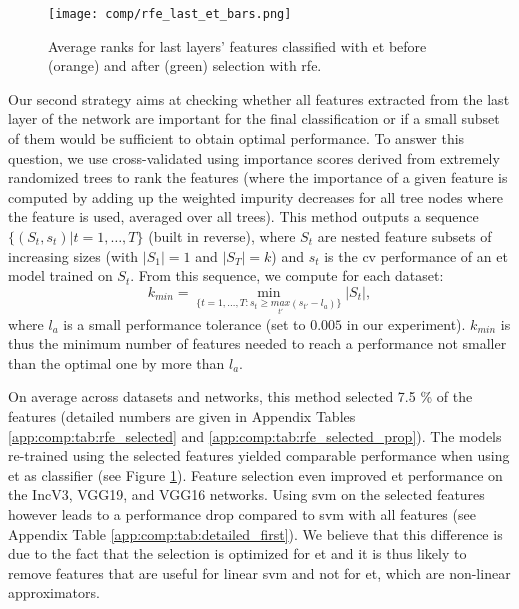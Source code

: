 \begin{figure}
    \centering
    \texttt{[image: comp/rfe\_last\_et\_bars.png]}
    \caption{Average ranks for last layers' features classified with \acrshort{et} before (orange) and after (green) selection with \acrlong{rfe}.}
    \label{fig:comp:exp_rfe_last_et_cmp}
\end{figure}

Our second strategy aims at checking whether all features extracted from the last layer of the network are important for the final classification or if a small subset of them would be sufficient to obtain optimal performance. To answer this question, we use cross-validated  \cite{guyon2002gene} using importance scores derived from extremely randomized trees to rank the features (where the importance of a given feature is computed by adding up the weighted impurity decreases for all tree nodes where the feature is used, averaged over all trees). This method outputs a sequence $\{(S_t,s_t)|t=1,\ldots,T\}$ (built in reverse), where $S_t$ are nested feature subsets of increasing sizes (with $|S_1|=1$ and $|S_T|=k$) and $s_t$ is the \acrlong{cv} performance of an \acrshort{et} model trained on $S_t$. From this sequence, we compute for each dataset:
$$k_{min} = \min_{\{t=1,\ldots,T: s_t\geq \underset{t'}{max} (s_{t'}-l_a)\}} |S_t|,$$
where $l_a$ is a small performance tolerance (set to $0.005$ in our experiment). $k_{min}$ is thus the minimum number of features needed to reach a performance not smaller than the optimal one by more than $l_a$.

On average across datasets and networks, this method selected 7.5 \% of the features (detailed numbers are given in Appendix Tables \ref{app:comp:tab:rfe_selected} and
\ref{app:comp:tab:rfe_selected_prop}). The models re-trained using the selected features yielded comparable performance when using \acrshort{et} as classifier (see Figure \ref{fig:comp:exp_rfe_last_et_cmp}). Feature selection even improved \acrshort{et} performance on the IncV3, VGG19, and VGG16 networks. Using \acrshort{svm} on the selected features however leads to a performance drop compared to \acrshort{svm} with all features (see Appendix Table \ref{app:comp:tab:detailed_first}). We believe that this difference is due to the fact that the selection is optimized for \acrshort{et} and it is thus likely to remove features that are useful for linear \acrshort{svm} and not for \acrshort{et}, which are non-linear approximators.


